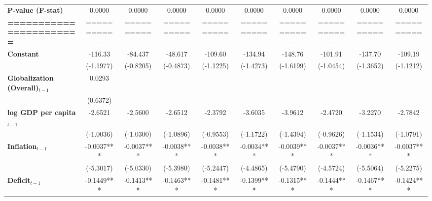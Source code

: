 \begin{center}
\begin{tabular}{lccccccccc}
\textbf{P-value (F-stat)}          &     0.0000     &      0.0000      &      0.0000      &      0.0000      &      0.0000      &      0.0000      &      0.0000      &      0.0000      &      0.0000       \\
\textbf{=======================}   &  ============  &   ============   &   ============   &   ============   &   ============   &   ============   &   ============   &   ============   &   ============    \\
\textbf{Constant}                     &    -116.33     &     -84.437      &     -48.617      &     -109.60      &     -134.94      &     -148.76      &     -101.91      &     -137.70      &     -109.19       \\
\textbf{ }                         &   (-1.1977)    &    (-0.8205)     &    (-0.4873)     &    (-1.1225)     &    (-1.4273)     &    (-1.6199)     &    (-1.0454)     &    (-1.3652)     &    (-1.1212)      \\
\textbf{Globalization (Overall)$_{t-1}$}               &     0.0293     &                  &                  &                  &                  &                  &                  &                  &                   \\
\textbf{ }                         &    (0.6372)    &                  &                  &                  &                  &                  &                  &                  &                   \\
\textbf{log GDP per capita$_{t-1}$}           &    -2.6521     &     -2.5600      &     -2.6512      &     -2.3792      &     -3.6035      &     -3.9612      &     -2.4720      &     -3.2270      &     -2.7842       \\
\textbf{ }                         &   (-1.0036)    &    (-1.0300)     &    (-1.0896)     &    (-0.9553)     &    (-1.1722)     &    (-1.4394)     &    (-0.9626)     &    (-1.1534)     &    (-1.0791)      \\
\textbf{Inflation$_{t-1}$}      &   -0.0037***   &    -0.0037***    &    -0.0038***    &    -0.0038***    &    -0.0034***    &    -0.0039***    &    -0.0037***    &    -0.0036***    &    -0.0037***     \\
\textbf{ }                         &   (-5.3017)    &    (-5.0330)     &    (-5.3980)     &    (-5.2447)     &    (-4.4865)     &    (-5.4790)     &    (-4.5724)     &    (-5.5064)     &    (-5.2275)      \\
\textbf{Deficit$_{t-1}$}             &   -0.1449***   &    -0.1413***    &    -0.1463***    &    -0.1481***    &    -0.1399***    &    -0.1315***    &    -0.1444***    &    -0.1467***    &    -0.1424***     \\

\end{tabular}
\end{center}
